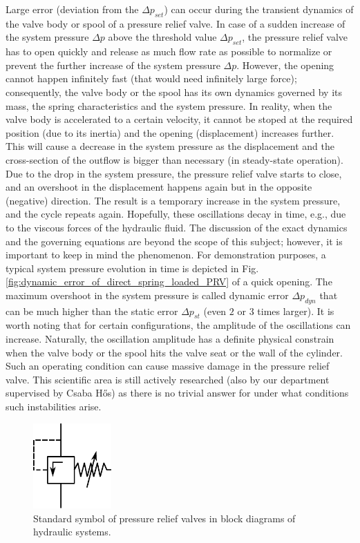 Large error (deviation from the $\Delta p_{set}$) can occur during the transient dynamics of the valve body or spool of a pressure relief valve. In case of a sudden increase of the system pressure $\Delta p$ above the threshold value $\Delta p_{set}$, the pressure relief valve has to open quickly and release as much flow rate as possible to normalize or prevent the further increase of the system pressure $\Delta p$. However, the opening cannot happen infinitely fast (that would need infinitely large force); consequently, the valve body or the spool has its own dynamics governed by its mass, the spring characteristics and the system pressure. In reality, when the valve body is accelerated to a certain velocity, it cannot be stoped at the required position (due to its inertia) and the opening (displacement) increases further. This will cause a decrease in the system pressure as the displacement and the cross-section of the outflow is bigger than necessary (in steady-state operation). Due to the drop in the system pressure, the pressure relief valve starts to close, and an overshoot in the displacement happens again but in the opposite (negative) direction. The result is a temporary increase in the system pressure, and the cycle repeats again. Hopefully, these oscillations decay in time, e.g., due to the viscous forces of the hydraulic fluid. The discussion of the exact dynamics and the governing equations are beyond the scope of this subject; however, it is important to keep in mind the phenomenon. For demonstration purposes, a typical system pressure evolution in time is depicted in Fig.\,\ref{fig:dynamic_error_of_direct_spring_loaded_PRV} of a quick opening. The maximum overshoot in the system pressure is called dynamic error $\Delta p_{dyn}$ that can be much higher than the static error $\Delta p_{st}$ (even $2$ or $3$ times larger). It is worth noting that for certain configurations, the amplitude of the oscillations can increase. Naturally, the oscillation amplitude has a definite physical constrain when the valve body or the spool hits the valve seat or the wall of the cylinder. Such an operating condition can cause massive damage in the pressure relief valve. This scientific area is still actively researched (also by our department supervised by Csaba H\H{o}s) as there is no trivial answer for under what conditions such instabilities arise.

\begin{figure}[ht!]
	\centering
		\includegraphics[width=3cm]{PositiveDisplacementPumps/Figures/Standard_Symbol_Of_Pressure_Relief_Valves.pdf}
	\caption{Standard symbol of pressure relief valves in block diagrams of hydraulic systems.}
	\label{fig:standard_symbol_of_PRV}
\end{figure}

